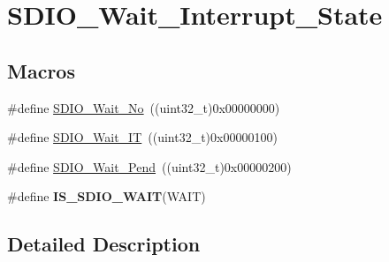 \hypertarget{group___s_d_i_o___wait___interrupt___state}{\section{S\-D\-I\-O\-\_\-\-Wait\-\_\-\-Interrupt\-\_\-\-State}
\label{group___s_d_i_o___wait___interrupt___state}
}
\subsection*{Macros}
\begin{DoxyCompactItemize}
\item 
\#define \hyperlink{group___s_d_i_o___wait___interrupt___state_ga266294e1ffd7a4b45e62bff753ca44b2}{S\-D\-I\-O\-\_\-\-Wait\-\_\-\-No}~((uint32\-\_\-t)0x00000000)
\item 
\#define \hyperlink{group___s_d_i_o___wait___interrupt___state_ga3914bbe26a656c8e151272ccdc12c71c}{S\-D\-I\-O\-\_\-\-Wait\-\_\-\-I\-T}~((uint32\-\_\-t)0x00000100)
\item 
\#define \hyperlink{group___s_d_i_o___wait___interrupt___state_ga2a4104023a7f8403ddd159ec3bbb8592}{S\-D\-I\-O\-\_\-\-Wait\-\_\-\-Pend}~((uint32\-\_\-t)0x00000200)
\item 
\#define {\bfseries I\-S\-\_\-\-S\-D\-I\-O\-\_\-\-W\-A\-I\-T}(W\-A\-I\-T)
\end{DoxyCompactItemize}


\subsection{Detailed Description}


